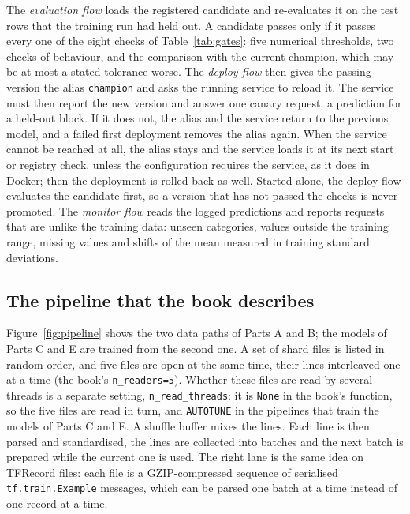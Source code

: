 The \emph{evaluation flow} loads the registered candidate and re-evaluates it on the test rows that the training run had held out. A candidate passes only if it passes every one of the eight checks of Table~\ref{tab:gates}: five numerical thresholds, two checks of behaviour, and the comparison with the current champion, which may be at most a stated tolerance worse. The \emph{deploy flow} then gives the passing version the alias \texttt{champion} and asks the running service to reload it. The service must then report the new version and answer one canary request, a prediction for a held-out block. If it does not, the alias and the service return to the previous model, and a failed first deployment removes the alias again. When the service cannot be reached at all, the alias stays and the service loads it at its next start or registry check, unless the configuration requires the service, as it does in Docker; then the deployment is rolled back as well. Started alone, the deploy flow evaluates the candidate first, so a version that has not passed the checks is never promoted. The \emph{monitor flow} reads the logged predictions and reports requests that are unlike the training data: unseen categories, values outside the training range, missing values and shifts of the mean measured in training standard deviations.

\subsection{The pipeline that the book describes}

Figure~\ref{fig:pipeline} shows the two data paths of Parts A and B; the models of Parts C and E are trained from the second one. A set of shard files is listed in random order, and five files are open at the same time, their lines interleaved one at a time (the book's \texttt{n\_readers=5}). Whether these files are read by several threads is a separate setting, \texttt{n\_read\_threads}: it is \texttt{None} in the book's function, so the five files are read in turn, and \texttt{AUTOTUNE} in the pipelines that train the models of Parts C and E. A shuffle buffer mixes the lines. Each line is then parsed and standardised, the lines are collected into batches and the next batch is prepared while the current one is used. The right lane is the same idea on TFRecord files: each file is a GZIP-compressed sequence of serialised \texttt{tf.train.Example} messages, which can be parsed one batch at a time instead of one record at a time.

